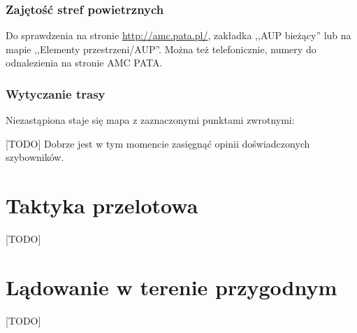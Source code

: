\documentclass{article}
\begin{document}
\subsubsection{Zajętość stref powietrznych}
Do sprawdzenia na stronie \url{http://amc.pata.pl/}, zakładka
,,AUP bieżący'' lub na mapie ,,Elementy przestrzeni/AUP''. Można też
telefonicznie, numery do odnalezienia na stronie AMC PATA.
\subsubsection{Wytyczanie trasy}
Niezastąpiona staje się mapa z zaznaczonymi punktami zwrotnymi:

[TODO] %
\noindent
Dobrze jest w tym momencie zasięgnąć opinii doświadczonych szybowników.

\newpage

\section{Taktyka przelotowa}
[TODO] %
\newpage

\section{Lądowanie w terenie przygodnym}
[TODO] %
\end{document}
